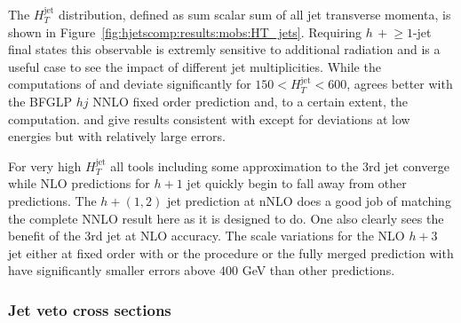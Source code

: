 
The $H_T^\text{jet}$ distribution, defined as sum scalar sum of all jet 
transverse momenta, is shown in Figure~\ref{fig:hjetscomp:results:mobs:HT_jets}. 
Requiring $h\,+\!\ge\!\!1$-jet final states this observable is
extremly sensitive to additional radiation and is a useful case to see 
the impact of different jet multiplicities. While the \NNLOPS 
computations of \Sherpa and \Powheg deviate significantly for 
$150 < H_T^\text{jet} < 600$, \Sherpa \NNLOPS agrees better with 
the BFGLP $hj$ NNLO fixed order prediction and, to a certain extent, 
the \Sherpa \MEPSatNLO computation. \Herwig and \MGaMC give results 
consistent with \Powheg except for deviations at low energies but with 
relatively large errors.

For very high $H_T^\text{jet}$ all tools including some approximation to the 3rd
jet converge while NLO predictions for $h+1$ jet quickly begin to fall away
from other predictions. The \Loopsim $h+(1,2)$ jet prediction at nNLO does a good
job of matching the complete NNLO result here as it is designed to do. One also
clearly sees the benefit of the 3rd jet at NLO accuracy.  The scale variations
for the NLO $h+3$ jet either at fixed order with \Loopsim or the \Minlo
procedure or the fully merged prediction with \Sherpa \MEPSatNLO have
significantly smaller errors above $400$ GeV than other predictions.




\clearpage
\subsubsection{Jet veto cross sections}
\label{sec:hjetscomp:results:jvobs}


